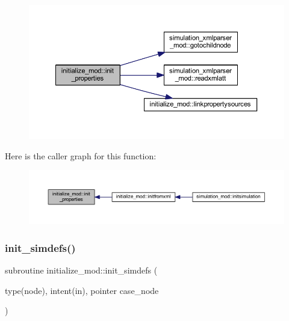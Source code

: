 \begin{figure}[H]
\begin{center}
\leavevmode
\includegraphics[width=350pt]{namespaceinitialize__mod_a4c7a93dca8bb7b573e91f877033ab22a_cgraph}
\end{center}
\end{figure}
Here is the caller graph for this function\+:\nopagebreak
\begin{figure}[H]
\begin{center}
\leavevmode
\includegraphics[width=350pt]{namespaceinitialize__mod_a4c7a93dca8bb7b573e91f877033ab22a_icgraph}
\end{center}
\end{figure}
\mbox{\label{namespaceinitialize__mod_a18736cca205403067232125b8e510ab2}} 
\subsubsection{\texorpdfstring{init\+\_\+simdefs()}{init\_simdefs()}}
{\footnotesize\ttfamily subroutine initialize\+\_\+mod\+::init\+\_\+simdefs (\begin{DoxyParamCaption}\item[{type(node), intent(in), pointer}]{case\+\_\+node }\end{DoxyParamCaption})\hspace{0.3cm}{\ttfamily [private]}}



